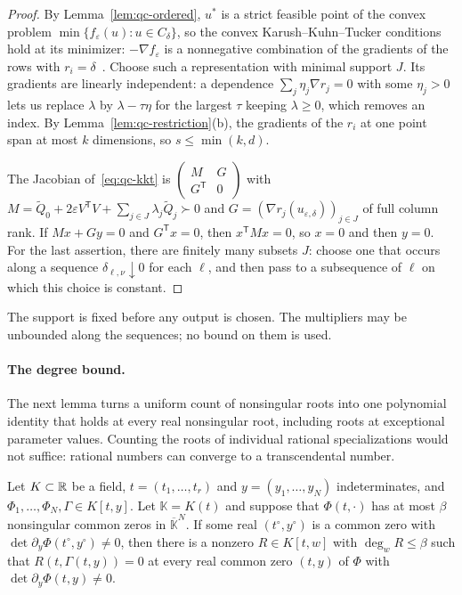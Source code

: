 \begin{proof}
By Lemma~\ref{lem:qc-ordered}, $u^*$ is a strict feasible point of the convex
problem $\min\{f_\varepsilon(u):u\in C_\delta\}$, so the convex
Karush--Kuhn--Tucker conditions hold at its minimizer: $-\nabla f_\varepsilon$
is a nonnegative combination of the gradients of the rows with
$r_i=\delta$~\cite{Rockafellar1970}. Choose such a representation with
minimal support $J$. Its gradients are linearly independent: a dependence
$\sum_j\eta_j\nabla r_j=0$ with some $\eta_j>0$ lets us replace $\lambda$ by
$\lambda-\tau\eta$ for the largest $\tau$ keeping $\lambda\ge0$, which
removes an index. By Lemma~\ref{lem:qc-restriction}(b), the gradients of the
$r_i$ at one point span at most $k$ dimensions, so $s\le\min(k,d)$.

The Jacobian of~\eqref{eq:qc-kkt} is
$\left(\begin{smallmatrix}M&G\\G^{\mathsf T}&0\end{smallmatrix}\right)$ with
$M=\tilde Q_0+2\varepsilon V^{\mathsf T}V+\sum_{j\in J}\lambda_j\tilde Q_j\succ0$
and $G=(\nabla r_j(u_{\varepsilon,\delta}))_{j\in J}$ of full column rank. If
$Mx+Gy=0$ and $G^{\mathsf T}x=0$, then $x^{\mathsf T}Mx=0$, so $x=0$ and then
$y=0$. For the last assertion, there are finitely many subsets $J$: choose one
that occurs along a sequence $\delta_{\ell,\nu}\downarrow0$ for each $\ell$,
and then pass to a subsequence of $\ell$ on which this choice is constant.
\end{proof}

The support is fixed before any output is chosen. The multipliers may be
unbounded along the sequences; no bound on them is used.

\paragraph{The degree bound.}
The next lemma turns a uniform count of nonsingular roots into one polynomial
identity that holds at every real nonsingular root, including roots at
exceptional parameter values. Counting the roots of individual rational
specializations would not suffice: rational numbers can converge to a
transcendental number.

\begin{lemma}
\label{lem:qc-parameter}
Let $K\subset\mathbb R$ be a field, $t=(t_1,\ldots,t_r)$ and $y=(y_1,\ldots,y_N)$
indeterminates, and $\Phi_1,\ldots,\Phi_N,\Gamma\in K[t,y]$. Let $\mathbb K=K(t)$
and suppose that $\Phi(t,\cdot)$ has at most $\beta$ nonsingular common zeros
in $\overline{\mathbb K}^N$. If some real $(t^\circ,y^\circ)$ is a common zero
with $\det\partial_y\Phi(t^\circ,y^\circ)\ne0$, then there is a nonzero
$R\in K[t,w]$ with $\deg_wR\le\beta$ such that $R(t,\Gamma(t,y))=0$ at every
real common zero $(t,y)$ of $\Phi$ with $\det\partial_y\Phi(t,y)\ne0$.
\end{lemma}

